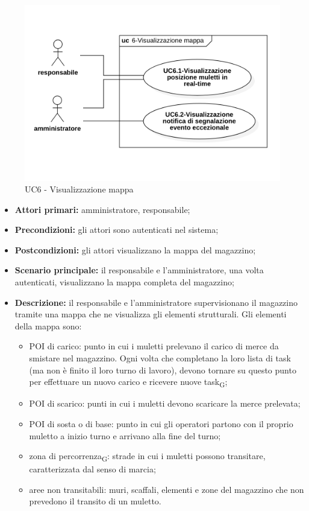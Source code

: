 \begin{figure}[H]
	\centering
	\includegraphics[scale=0.52]{res/images/uc6.png}
	\caption{UC6 - Visualizzazione mappa}
\end{figure}

\begin{itemize}
	\item 	\textbf{Attori primari:} amministratore, responsabile;
	\item 	\textbf{Precondizioni:} gli attori sono autenticati nel sistema;
	\item 	\textbf{Postcondizioni:} gli attori visualizzano la mappa del magazzino;
	\item 	\textbf{Scenario principale:} il responsabile e l'amministratore, una volta autenticati, visualizzano la mappa completa del magazzino;
	\item 	\textbf{Descrizione:} il responsabile e l'amministratore supervisionano il magazzino tramite una mappa che ne visualizza gli elementi strutturali. Gli elementi della mappa sono:
	\begin{itemize}
		\item POI di carico:  punto in cui i muletti prelevano il carico di merce da smistare nel magazzino. Ogni volta che completano la loro lista di task (ma non è finito il loro turno di lavoro), devono tornare su questo punto per effettuare un nuovo carico e ricevere nuove task\textsubscript{G};
		\item POI di scarico: punti in cui i muletti devono scaricare la merce prelevata;
		\item POI di sosta o di base: punto in cui gli operatori partono con il proprio muletto a inizio turno e arrivano alla fine del turno;
		\item zona di percorrenza\textsubscript{G}: strade in cui i muletti possono transitare, caratterizzata dal senso di marcia;
		\item aree non transitabili: muri, scaffali, elementi e zone del magazzino che non prevedono il transito di un muletto.
	\end{itemize}

\end{itemize}


